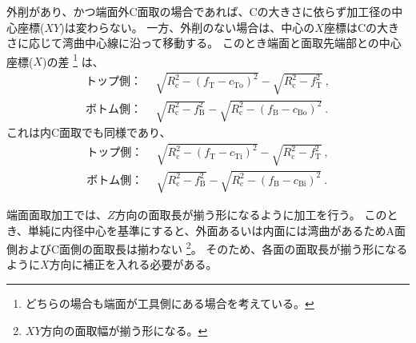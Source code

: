 \clearpage
外削があり、かつ端面外C面取の場合であれば、Cの大きさに依らず加工径の中心座標($XY$)は変わらない。
一方、外削のない場合は、中心の$X$座標はCの大きさに応じて湾曲中心線に沿って移動する。
このとき端面と面取先端部との中心座標($X$)の差
\footnote{どちらの場合も端面が工具側にある場合を考えている。}
は、
\begin{align*}
  \text{トップ側：}&~~
  \sqrt{R_\mathrm c^2-\left(f_\mathrm T-c_\mathrm{To}\right)^2}-\sqrt{R_\mathrm c^2-f_\mathrm T^2}\ ,\\
  \text{ボトム側：}&~~
  \sqrt{R_\mathrm c^2-f_\mathrm B^2}-\sqrt{R_\mathrm c^2-\left(f_\mathrm B-c_\mathrm{Bo}\right)^2}\ .
\end{align*}
これは内C面取でも同様であり、
\begin{align*}
  \text{トップ側：}&~~
  \sqrt{R_\mathrm c^2-\left(f_\mathrm T-c_\mathrm{Ti}\right)^2}-\sqrt{R_\mathrm c^2-f_\mathrm T^2}\ ,\\
  \text{ボトム側：}&~~
  \sqrt{R_\mathrm c^2-f_\mathrm B^2}-\sqrt{R_\mathrm c^2-\left(f_\mathrm B-c_\mathrm{Bi}\right)^2}\ .
\end{align*}



端面面取加工では、$Z$方向の面取長が揃う形になるように加工を行う。
このとき、単純に内径中心を基準にすると、外面あるいは内面には湾曲があるためA面側およびC面側の面取長は揃わない
\footnote{$XY$方向の面取幅が揃う形になる。}。
そのため、各面の面取長が揃う形になるように$X$方向に補正を入れる必要がある。













